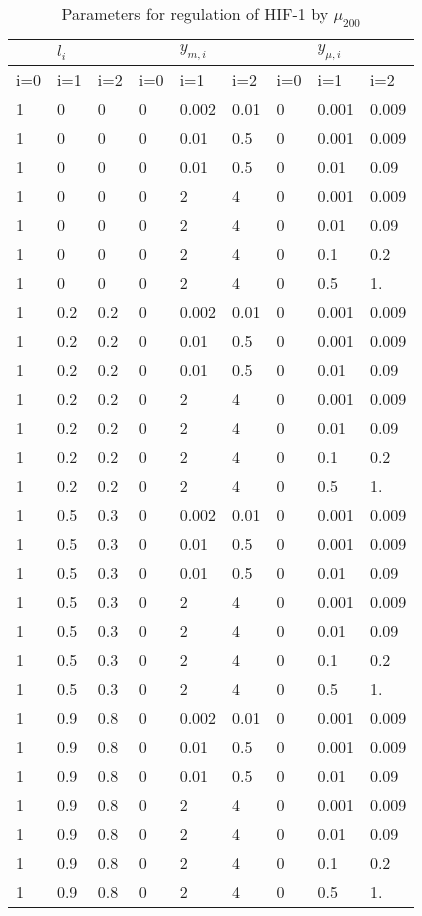 \documentclass{article}
\begin{document}
\begin{table}[ht ]
\begin{tabular}{lll|lll|lll}
   & $l_i$ &   &     &   $y_{m,i}$  &     &    & $y_{\mu,i}$    & \\
\hline
 i=0 & i=1 & i=2 & i=0 & i=1 & i=2 & i=0 & i=1 & i=2 \\
\hline
 1 & 0   & 0   & 0 & 0.002 & 0.01 & 0 & 0.001  & 0.009\\ 
 1 & 0   & 0   & 0 & 0.01  & 0.5  & 0 & 0.001  & 0.009\\ 
 1 & 0   & 0   & 0 & 0.01  & 0.5  & 0 & 0.01   & 0.09\\
 1 & 0   & 0   & 0 & 2     & 4    & 0 & 0.001  & 0.009\\ 
1 & 0   & 0   & 0 & 2     & 4    & 0 & 0.01   & 0.09\\
 1 & 0   & 0   & 0 & 2     & 4    & 0 & 0.1    & 0.2\\
 1 & 0   & 0   & 0 & 2     & 4    & 0 & 0.5    & 1.\\
 1 & 0.2 & 0.2 & 0 & 0.002 & 0.01 & 0 & 0.001  & 0.009\\ 
 1 & 0.2 & 0.2 & 0 & 0.01  & 0.5  & 0 & 0.001  & 0.009\\ 
 1 & 0.2 & 0.2 & 0 & 0.01  & 0.5  & 0 & 0.01   & 0.09\\
 1 & 0.2 & 0.2 & 0 & 2     & 4    & 0 & 0.001  & 0.009\\ 
 1 & 0.2 & 0.2 & 0 & 2     & 4    & 0 & 0.01   & 0.09\\
 1 & 0.2 & 0.2 & 0 & 2     & 4    & 0 & 0.1    & 0.2\\
 1 & 0.2 & 0.2 & 0 & 2     & 4    & 0 & 0.5    & 1.\\
 1 & 0.5 & 0.3 & 0 & 0.002 & 0.01 & 0 & 0.001  & 0.009\\ 
 1 & 0.5 & 0.3 & 0 & 0.01  & 0.5  & 0 & 0.001  & 0.009\\ 
 1 & 0.5 & 0.3 & 0 & 0.01  & 0.5  & 0 & 0.01   & 0.09\\
 1 & 0.5 & 0.3 & 0 & 2     & 4    & 0 & 0.001  & 0.009\\ 
 1 & 0.5 & 0.3 & 0 & 2     & 4    & 0 & 0.01   & 0.09\\
 1 & 0.5 & 0.3 & 0 & 2     & 4    & 0 & 0.1    & 0.2\\
 1 & 0.5 & 0.3 & 0 & 2     & 4    & 0 & 0.5    & 1.\\
 1 & 0.9 & 0.8 & 0 & 0.002 & 0.01 & 0 & 0.001  & 0.009\\ 
 1 & 0.9 & 0.8 & 0 & 0.01  & 0.5  & 0 & 0.001  & 0.009\\ 
 1 & 0.9 & 0.8 & 0 & 0.01  & 0.5  & 0 & 0.01   & 0.09\\
 1 & 0.9 & 0.8 & 0 & 2     & 4    & 0 & 0.001  & 0.009\\ 
 1 & 0.9 & 0.8 & 0 & 2     & 4    & 0 & 0.01   & 0.09\\
1 & 0.9 & 0.8 & 0 & 2     & 4    & 0 & 0.1    & 0.2\\
 1 & 0.9 & 0.8 & 0 & 2     & 4    & 0 & 0.5    & 1.\\
\end{tabular}
\label{table:uhparams}
\caption{Parameters for regulation of HIF-1 by $\mu_{200}$}
\end{table}
\end{document}
